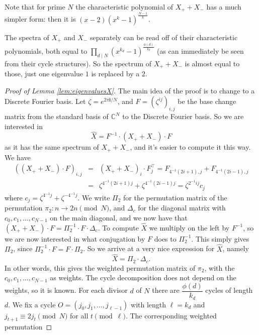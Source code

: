 \documentclass[10pt]{article}
\theoremstyle{definition}
\newcommand{\C}{\mathbb{C}}
\newcommand{\ii}{\mathbf{i}}
\begin{document}
Note that for prime $ N $ the characteristic polynomial of $ X_+ + X_- $ has a much simpler form:
then it is $ (x-2) \left(x^k-1\right)^{\frac{N-1}{k}} $.

The spectra of $ X_+ $ and $ X_- $ separately can be read off of their characteristic polynomials, both
equal to $ \displaystyle\prod_{d \mid N} \left(x^{k_d}-1\right)^{\frac{\phi(d)}{k_d}} $ (as can
immediately be seen from their cycle structures). So the spectrum of $ X_+ + X_- $ is almost equal to
those, just one eigenvalue $ 1 $ is replaced by a $ 2 $.

\begin{proof}[Proof of Lemma \ref{lem:eigenvaluesX}]
    The main idea of the proof is to change to a Discrete Fourier basis. Let $ \zeta = e^{2 \pi \ii / N} $,
    and $ F = \left( \zeta^{ij} \right) _{i,j} $ be the base change matrix from the standard basis of $ \C^N $
    to the Discrete Fourier basis. So we are interested in
    \[ \hat{X} = F^{-1} \cdot (X_+ + X_-) \cdot F \]
    as it has the same spectrum of $ X_+ + X_- $, and it's easier to compute it this way. We have
    \begin{eqnarray*} \left((X_+ + X_-) \cdot F \right)_{i,j}
        & = & (X_+ + X_-)_i \cdot F^{\top}_j = F_{4^{-1}(2i+1),j} + F_{4^{-1}(2i-1),j} \\
        & = & \zeta^{4^{-1}(2i+1)j} + \zeta^{4^{-1}(2i-1)j} = \zeta^{2^{-1}ij} c_j
    \end{eqnarray*}
    where $ c_j = \zeta^{4^{-1}j} + \zeta^{-4^{-1}j} $. We write $ \Pi_2 $ for the permutation matrix of the
    permutation $ \pi_2: n \to 2 n \pmod{N} $, and $ \Delta_c $ for the diagonal matrix with
    $ c_0, c_1, \ldots, c_{N-1} $ on the main diagonal, and we now have that
    $ (X_+ + X_-) \cdot F = \Pi_2^{-1} \cdot F \cdot \Delta_c $. To compute $ \hat{X} $ we multiply on the left
    by $ F^{-1}  $, so we are now interested in what conjugation by $ F $ does to $ \Pi_2^{-1} $. This simply
    gives $ \Pi_2 $, since $ \Pi_2^{-1} \cdot F = F \cdot \Pi_2 $. So we arrive at a very nice expression for
    $ \hat{X} $, namely
    \[ \hat{X} = \Pi_2 \cdot \Delta_c . \]
    In other words, this gives the weighted permutation matrix of $ \pi_2 $, with the
    $ c_0, c_1, \ldots, c_{N-1} $ as weights. The cycle decomposition does not depend on the weights, so it
    is known. For each divisor $ d $ of $ N $ there are $ \dfrac{\phi(d)}{k_d} $ cycles of length $ d $. We
    fix a cycle $ O = (j_0, j_1, \ldots, j_{\ell-1}) $ with length $ \ell = k_d $ and
    $ j_{t+1} \equiv 2 j_t \pmod{N} $ for all $ t \pmod{\ell} $. The corresponding weighted permutation

\end{proof}
\end{document}

